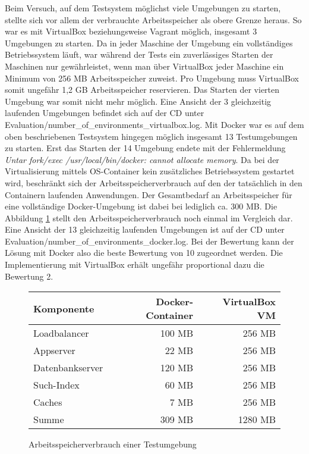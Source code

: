 Beim Versuch, auf dem Testsystem möglichst viele Umgebungen zu starten, stellte sich vor allem der verbrauchte Arbeitsspeicher als obere Grenze heraus. So war es mit VirtualBox beziehungsweise Vagrant möglich, insgesamt 3 Umgebungen zu starten. Da in jeder Maschine der Umgebung ein vollständiges Betriebssystem läuft, war während der Tests ein zuverlässiges Starten der Maschinen nur gewährleistet, wenn man über VirtualBox jeder Maschine ein Minimum von 256 MB Arbeitsspeicher zuweist. Pro Umgebung muss VirtualBox somit ungefähr 1,2 GB Arbeitsspeicher reservieren. Das Starten der vierten Umgebung war somit nicht mehr möglich. Eine Ansicht der 3 gleichzeitig laufenden Umgebungen befindet sich auf der CD unter Evaluation/number\_of\_environments\_virtualbox.log. Mit Docker war es auf dem oben beschriebenen Testsystem hingegen möglich insgesamt 13 Testumgebungen zu starten. Erst das Starten der 14 Umgebung endete mit der Fehlermeldung \textit{Untar fork/exec /usr/local/bin/docker: cannot allocate memory}. Da bei der Virtualisierung mittels OS-Container kein zusätzliches Betriebssystem gestartet wird, beschränkt sich der Arbeitsspeicherverbrauch auf den der tatsächlich in den Containern laufenden Anwendungen. Der Gesamtbedarf an Arbeitsspeicher für eine vollständige Docker-Umgebung ist dabei bei lediglich ca. 300 MB. Die Abbildung \ref{memory} stellt den Arbeitsspeicherverbrauch noch einmal im Vergleich dar. Eine Ansicht der 13 gleichzeitig laufenden Umgebungen ist auf der CD unter Evaluation/number\_of\_environments\_docker.log. Bei der Bewertung kann der Lösung mit Docker also die beste Bewertung von 10 zugeordnet werden. Die Implementierung mit VirtualBox erhält ungefähr proportional dazu die Bewertung 2.

\begin{figure}[!ht]
  \begin{center}
    \resizebox{15cm}{!} {
      \begin{tabular}{|l|r|r|}
      \hline
      Komponente & Docker-Container & VirtualBox VM \\
      \hline
      Loadbalancer & 100 MB & 256 MB \\
      \hline
      Appserver & 22 MB & 256 MB \\
      \hline
      Datenbankserver & 120 MB & 256 MB \\
      \hline
      Such-Index & 60 MB & 256 MB \\
      \hline
      Caches & 7 MB & 256 MB \\
      \hline
      Summe & 309 MB & 1280 MB \\
      \hline
      \end{tabular}
    }
    \caption{Arbeitsspeicherverbrauch einer Testumgebung}
    \label{memory}
  \end{center}
\end{figure}

